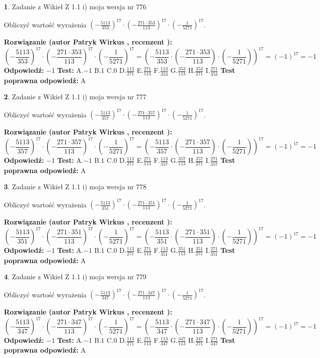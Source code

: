 \documentclass[12pt, a4paper]{article}
\theoremstyle{definition} %
\newtheorem{zad}{}
\newcommand{\zadStart}[1]{\begin{zad}#1\newline}
\newcommand{\zadStop}{\end{zad}}
\newcommand{\rozwStart}[2]{\noindent \textbf{Rozwiązanie (autor #1 , recenzent #2): }\newline}
\newcommand{\rozwStop}{\newline}
\newcommand{\odpStart}{\noindent \textbf{Odpowiedź:}\newline}
\newcommand{\odpStop}{\newline}
\newcommand{\testStart}{\noindent \textbf{Test:}\newline}
\newcommand{\testStop}{\newline}
\newcommand{\kluczStart}{\noindent \textbf{Test poprawna odpowiedź:}\newline}
\newcommand{\kluczStop}{\newline}
\begin{document}
\zadStart{Zadanie z Wikieł Z 1.1 i) moja wersja nr 776}

Obliczyć wartość wyrażenia $(-\frac{5113}{353})^{17} \cdot (-\frac{271 \cdot 353}{113})^{17} \cdot (-\frac{1}{5271})^{17}$.
\zadStop
\rozwStart{Patryk Wirkus}{}
$$(-\frac{5113}{353})^{17} \cdot (-\frac{271 \cdot 353}{113})^{17} \cdot (-\frac{1}{5271})^{17} = (-\frac{5113}{353} \cdot (-\frac{271 \cdot 353}{113}) \cdot (-\frac{1}{5271}))^{17} = (-1)^{17} = -1$$
\rozwStop
\odpStart
$-1$
\odpStop
\testStart
A.$-1$ B.$1$ C.$0$ D.$\frac{113}{271}$ E.$\frac{271}{113}$
F.$\frac{113}{353}$ G.$\frac{353}{113}$
H.$\frac{353}{271}$
I.$\frac{271}{353}$
\testStop
\kluczStart
A
\kluczStop



\zadStart{Zadanie z Wikieł Z 1.1 i) moja wersja nr 777}

Obliczyć wartość wyrażenia $(-\frac{5113}{357})^{17} \cdot (-\frac{271 \cdot 357}{113})^{17} \cdot (-\frac{1}{5271})^{17}$.
\zadStop
\rozwStart{Patryk Wirkus}{}
$$(-\frac{5113}{357})^{17} \cdot (-\frac{271 \cdot 357}{113})^{17} \cdot (-\frac{1}{5271})^{17} = (-\frac{5113}{357} \cdot (-\frac{271 \cdot 357}{113}) \cdot (-\frac{1}{5271}))^{17} = (-1)^{17} = -1$$
\rozwStop
\odpStart
$-1$
\odpStop
\testStart
A.$-1$ B.$1$ C.$0$ D.$\frac{113}{271}$ E.$\frac{271}{113}$
F.$\frac{113}{357}$ G.$\frac{357}{113}$
H.$\frac{357}{271}$
I.$\frac{271}{357}$
\testStop
\kluczStart
A
\kluczStop



\zadStart{Zadanie z Wikieł Z 1.1 i) moja wersja nr 778}

Obliczyć wartość wyrażenia $(-\frac{5113}{351})^{17} \cdot (-\frac{271 \cdot 351}{113})^{17} \cdot (-\frac{1}{5271})^{17}$.
\zadStop
\rozwStart{Patryk Wirkus}{}
$$(-\frac{5113}{351})^{17} \cdot (-\frac{271 \cdot 351}{113})^{17} \cdot (-\frac{1}{5271})^{17} = (-\frac{5113}{351} \cdot (-\frac{271 \cdot 351}{113}) \cdot (-\frac{1}{5271}))^{17} = (-1)^{17} = -1$$
\rozwStop
\odpStart
$-1$
\odpStop
\testStart
A.$-1$ B.$1$ C.$0$ D.$\frac{113}{271}$ E.$\frac{271}{113}$
F.$\frac{113}{351}$ G.$\frac{351}{113}$
H.$\frac{351}{271}$
I.$\frac{271}{351}$
\testStop
\kluczStart
A
\kluczStop



\zadStart{Zadanie z Wikieł Z 1.1 i) moja wersja nr 779}

Obliczyć wartość wyrażenia $(-\frac{5113}{347})^{17} \cdot (-\frac{271 \cdot 347}{113})^{17} \cdot (-\frac{1}{5271})^{17}$.
\zadStop
\rozwStart{Patryk Wirkus}{}
$$(-\frac{5113}{347})^{17} \cdot (-\frac{271 \cdot 347}{113})^{17} \cdot (-\frac{1}{5271})^{17} = (-\frac{5113}{347} \cdot (-\frac{271 \cdot 347}{113}) \cdot (-\frac{1}{5271}))^{17} = (-1)^{17} = -1$$
\rozwStop
\odpStart
$-1$
\odpStop
\testStart
A.$-1$ B.$1$ C.$0$ D.$\frac{113}{271}$ E.$\frac{271}{113}$
F.$\frac{113}{347}$ G.$\frac{347}{113}$
H.$\frac{347}{271}$
I.$\frac{271}{347}$
\testStop
\kluczStart
A
\kluczStop
\end{document}
